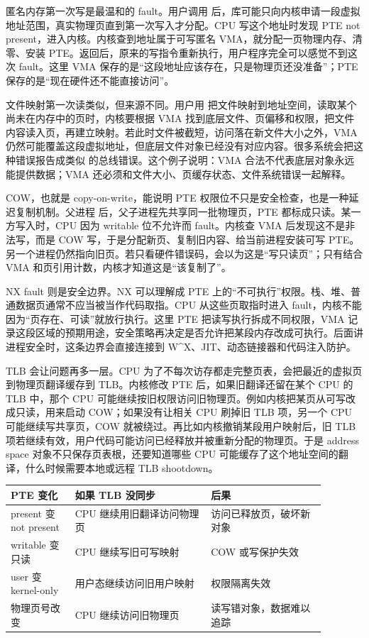 匿名内存第一次写是最温和的 fault。用户调用  后，库可能只向内核申请一段虚拟地址范围，真实物理页直到第一次写入才分配。CPU 写这个地址时发现 PTE not present，进入内核。内核查到地址属于可写匿名 VMA，就分配一页物理内存、清零、安装 PTE。返回后，原来的写指令重新执行，用户程序完全可以感觉不到这次 fault。这里 VMA 保存的是“这段地址应该存在，只是物理页还没准备”；PTE 保存的是“现在硬件还不能直接访问”。

文件映射第一次读类似，但来源不同。用户用  把文件映射到地址空间，读取某个尚未在内存中的页时，内核要根据 VMA 找到底层文件、页偏移和权限，把文件内容读入页，再建立映射。若此时文件被截短，访问落在新文件大小之外，VMA 仍然可能覆盖这段虚拟地址，但底层文件对象已经没有对应内容。很多系统会把这种错误报告成类似  的总线错误。这个例子说明：VMA 合法不代表底层对象永远能提供数据；VMA 还必须和文件大小、页缓存状态、文件系统错误一起解释。

COW，也就是 copy-on-write，能说明 PTE 权限位不只是安全检查，也是一种延迟复制机制。父进程  后，父子进程先共享同一批物理页，PTE 都标成只读。某一方写入时，CPU 因为 writable 位不允许而 fault。内核查 VMA 后发现这不是非法写，而是 COW 写，于是分配新页、复制旧内容、给当前进程安装可写 PTE。另一个进程仍然指向旧页。若只看硬件错误码，会以为这是“写只读页”；只有结合 VMA 和页引用计数，内核才知道这是“该复制了”。

NX fault 则是安全边界。NX 可以理解成 PTE 上的“不可执行”权限。栈、堆、普通数据页通常不应当被当作代码取指。CPU 从这些页取指时进入 fault，内核不能因为“页存在、可读”就放行执行。这里 PTE 把读写执行拆成不同权限，VMA 记录这段区域的预期用途，安全策略再决定是否允许把某段内存改成可执行。后面讲进程安全时，这条边界会直接连接到 W\^{}X、JIT、动态链接器和代码注入防护。

TLB 会让问题再多一层。CPU 为了不每次访存都走完整页表，会把最近的虚拟页到物理页翻译缓存到 TLB。内核修改 PTE 后，如果旧翻译还留在某个 CPU 的 TLB 中，那个 CPU 可能继续按旧权限访问旧物理页。例如内核把某页从可写改成只读，用来启动 COW；如果没有让相关 CPU 刷掉旧 TLB 项，另一个 CPU 可能继续写共享页，COW 就被绕过。再比如内核撤销某段用户映射后，旧 TLB 项若继续有效，用户代码可能访问已经释放并被重新分配的物理页。于是 address space 对象不只保存页表根，还要知道哪些 CPU 可能缓存了这个地址空间的翻译，什么时候需要本地或远程 TLB shootdown。

\begin{longtable}{p{0.18\linewidth}p{0.38\linewidth}p{0.32\linewidth}}
\toprule
PTE 变化 & 如果 TLB 没同步 & 后果 \\
\midrule
present 变 not present & CPU 继续用旧翻译访问物理页 & 访问已释放页，破坏新对象 \\
writable 变只读 & CPU 继续写旧可写映射 & COW 或写保护失效 \\
user 变 kernel-only & 用户态继续访问旧用户映射 & 权限隔离失效 \\
物理页号改变 & CPU 继续访问旧物理页 & 读写错对象，数据难以追踪 \\
\bottomrule
\end{longtable}

